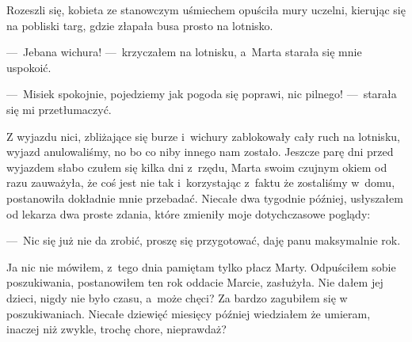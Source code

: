 Rozeszli się, kobieta ze stanowczym uśmiechem opuściła mury uczelni, kierując się na pobliski targ, gdzie złapała 
busa prosto na lotnisko.

\paraSep

---~Jebana wichura! ---~krzyczałem na lotnisku, a~Marta starała się mnie uspokoić.

---~Misiek spokojnie, pojedziemy jak pogoda się poprawi, nic pilnego! ---~starała się mi przetłumaczyć.

Z wyjazdu nici, zbliżające się burze i~wichury zablokowały cały ruch na lotnisku, wyjazd anulowaliśmy, no bo co niby 
innego nam zostało. Jeszcze parę dni przed wyjazdem słabo czułem się kilka dni z~rzędu, Marta swoim czujnym okiem od 
razu zauważyła, że coś jest nie tak i~korzystając z~faktu że zostaliśmy w~domu, postanowiła dokładnie mnie przebadać. 
Niecałe dwa tygodnie później, usłyszałem od lekarza dwa proste zdania, które zmieniły moje dotychczasowe poglądy:

---~Nic się już nie da zrobić, proszę się przygotować, daję panu maksymalnie rok.

Ja nic nie mówiłem, z~tego dnia pamiętam tylko płacz Marty. Odpuściłem sobie poszukiwania, postanowiłem ten rok 
oddacie Marcie, zasłużyła. Nie dałem jej dzieci, nigdy nie było czasu, a~może chęci? Za bardzo zagubiłem się w~
poszukiwaniach. Niecałe dziewięć miesięcy później wiedziałem że umieram, inaczej niż zwykle, trochę chore, nieprawdaż?
